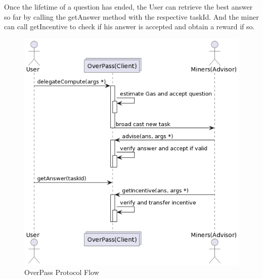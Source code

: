 Once the lifetime of a question has ended, the User can retrieve the best answer so far by calling the getAnswer method with the respective taskId. And the miner can call getIncentive to check if his answer is accepted and obtain a reward if so. 
\begin{figure}[H]
  \includegraphics[width=\linewidth]{image/overpass_overview.png}
  \caption{OverPass Protocol Flow}
  \label{fig:boat1}
\end{figure}